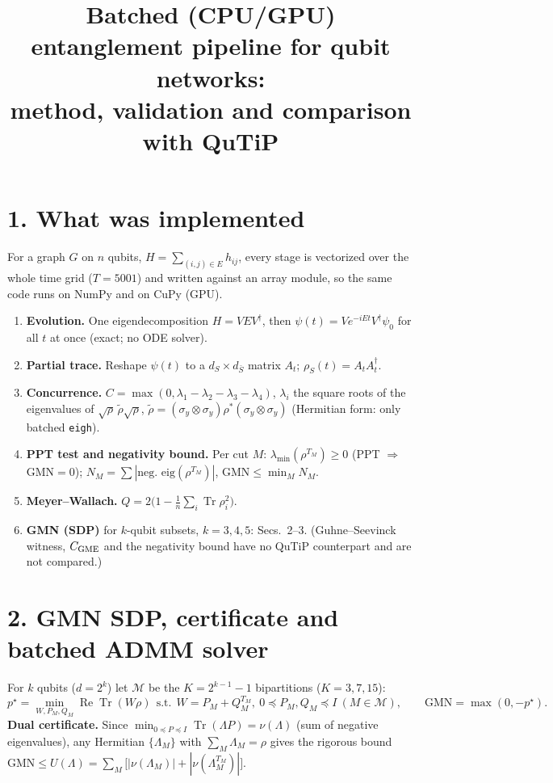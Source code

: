 \documentclass[10pt]{article}
\title{Batched (CPU/GPU) entanglement pipeline for qubit networks:\\ method, validation and comparison with QuTiP}
\author{}\date{}
\newcommand{\Tr}{\operatorname{Tr}}
\begin{document}
\maketitle\vspace{-2em}

\section*{1. What was implemented}
For a graph $G$ on $n$ qubits, $H=\sum_{(i,j)\in E}h_{ij}$, every stage is vectorized over the whole time grid ($T=5001$) and written against an array module, so the same code runs on NumPy and on CuPy (GPU).
\begin{enumerate}\itemsep0pt
\item \textbf{Evolution.} One eigendecomposition $H=VEV^\dagger$, then $\psi(t)=V e^{-iEt}V^\dagger\psi_0$ for all $t$ at once (exact; no ODE solver).
\item \textbf{Partial trace.} Reshape $\psi(t)$ to a $d_S\times d_{\bar S}$ matrix $A_t$; $\rho_S(t)=A_tA_t^\dagger$.
\item \textbf{Concurrence.} $C=\max(0,\lambda_1-\lambda_2-\lambda_3-\lambda_4)$, $\lambda_i$ the square roots of the eigenvalues of $\sqrt\rho\,\tilde\rho\sqrt\rho$, $\tilde\rho=(\sigma_y\!\otimes\!\sigma_y)\rho^*(\sigma_y\!\otimes\!\sigma_y)$ (Hermitian form: only batched \texttt{eigh}).
\item \textbf{PPT test and negativity bound.} Per cut $M$: $\lambda_{\min}(\rho^{T_M})\ge0$ (PPT $\Rightarrow$ GMN$=0$); $N_M=\sum|\text{neg.\ eig}(\rho^{T_M})|$, $\mathrm{GMN}\le\min_M N_M$.
\item \textbf{Meyer--Wallach.} $Q=2\big(1-\tfrac1n\sum_i\Tr\rho_i^2\big)$.
\item \textbf{GMN (SDP)} for $k$-qubit subsets, $k=3,4,5$: Secs.~2--3. (Guhne--Seevinck witness, $C_{\rm GME}$ and the negativity bound have no QuTiP counterpart and are not compared.)
\end{enumerate}

\section*{2. GMN SDP, certificate and batched ADMM solver}
For $k$ qubits ($d=2^k$) let $\mathcal M$ be the $K=2^{k-1}-1$ bipartitions ($K=3,7,15$):
\begin{equation}
p^\star=\min_{W,P_M,Q_M}\operatorname{Re}\Tr(W\rho)\ \ \text{s.t.}\ \ W=P_M+Q_M^{T_M},\ 0\preceq P_M,Q_M\preceq I\ (M\in\mathcal M),\qquad \mathrm{GMN}=\max(0,-p^\star).
\end{equation}
\textbf{Dual certificate.} Since $\min_{0\preceq P\preceq I}\Tr(\Lambda P)=\nu(\Lambda)$ (sum of negative eigenvalues), any Hermitian $\{\Lambda_M\}$ with $\sum_M\Lambda_M=\rho$ gives the rigorous bound
$\mathrm{GMN}\le U(\Lambda)=\sum_M\big[|\nu(\Lambda_M)|+|\nu(\Lambda_M^{T_M})|\big]$.
\end{document}
